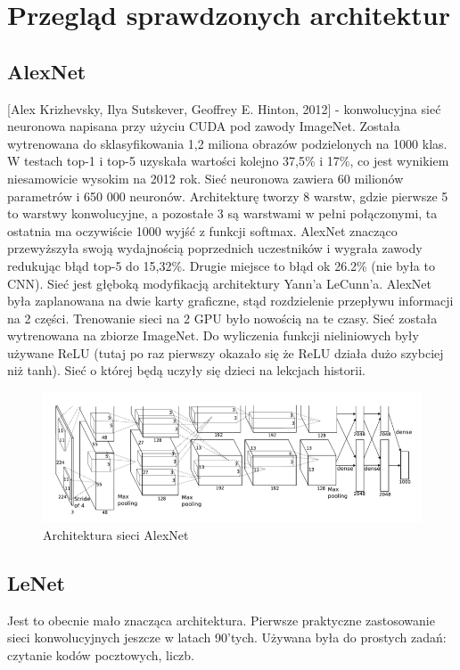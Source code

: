 \documentclass[a4paper,twoside,titlepage,openright]{book}
\begin{document}
\section{Przegląd sprawdzonych architektur}
\subsection{AlexNet}
 [Alex Krizhevsky, Ilya Sutskever, Geoffrey E. Hinton, 2012] - konwolucyjna sieć neuronowa napisana przy użyciu CUDA pod zawody ImageNet. Została wytrenowana do sklasyfikowania 1,2 miliona obrazów podzielonych na 1000 klas. W testach top-1 i top-5 uzyskała wartości kolejno 37,5\% i 17\%, co jest wynikiem niesamowicie wysokim na 2012 rok. Sieć neuronowa zawiera 60 milionów parametrów i 650 000 neuronów.
Architekturę tworzy 8 warstw, gdzie pierwsze 5 to warstwy konwolucyjne, a pozostałe 3 są warstwami w pełni połączonymi, ta ostatnia ma oczywiście 1000 wyjść z funkcji softmax.
AlexNet znacząco przewyższyła swoją wydajnością poprzednich uczestników i wygrała zawody redukując błąd top-5 do 15,32\%. Drugie miejsce to błąd ok 26.2\% (nie była to CNN).
Sieć jest głęboką modyfikacją architektury Yann’a LeCunn’a. AlexNet była zaplanowana na dwie karty graficzne, stąd rozdzielenie przepływu informacji na 2 części. Trenowanie sieci na 2 GPU było nowością na te czasy. Sieć została wytrenowana na zbiorze ImageNet. Do wyliczenia funkcji nieliniowych były używane ReLU (tutaj po raz pierwszy okazało się że ReLU działa dużo szybciej niż tanh). Sieć o której będą uczyły się dzieci na lekcjach historii.

\begin{figure}[h]
	\centering
			\includegraphics[resolution=120]{AlexNet.png}
		\caption{Architektura sieci AlexNet}
\end{figure}

\subsection{LeNet}
Jest to obecnie mało znacząca architektura. Pierwsze praktyczne zastosowanie sieci konwolucyjnych jeszcze w latach 90’tych. Używana była do prostych zadań: czytanie kodów pocztowych, liczb.
\end{document}
